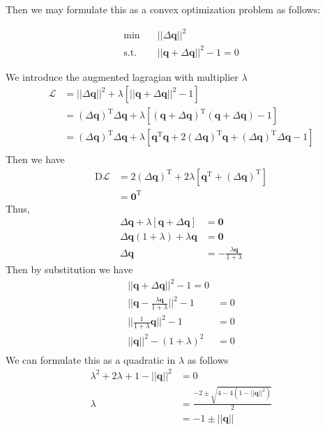 \documentclass{article}
\newcommand{\transpose}[1]{#1^\mathrm{T}}
\begin{document}
Then we may formulate this as a convex optimization problem as follows:

\begin{align}
    \min \quad & || \Delta \pmb{q} ||^2 \\
    \mathrm{s.t.} \quad & || \pmb{q} + \Delta \pmb{q} ||^2 -1 = 0
\end{align}

We introduce the augmented lagragian with multiplier $\lambda$
\begin{align*}
    \mathcal{L} &= || \Delta \pmb{q} ||^2 + \lambda \left[ || \pmb{q} + \Delta \pmb{q} ||^2 - 1 \right] \\
    &= \transpose{\left(\Delta \pmb{q} \right)} \Delta \pmb{q} + \lambda \left[ \transpose{\left(\pmb{q} + \Delta \pmb{q}\right)} \left(\pmb{q} + \Delta \pmb{q} \right) - 1 \right] \\
    &= \transpose{\left(\Delta \pmb{q} \right)} \Delta \pmb{q} + \lambda \left[ \transpose{\pmb{q}} \pmb{q} + 2\transpose{\left(\Delta \pmb{q} \right)} \pmb{q} + \transpose{\left(\Delta \pmb{q} \right)} \Delta \pmb{q}  - 1 \right] \\
\end{align*}
Then we have
\begin{align*}
    \mathrm{D}\mathcal{L} &= 2 \transpose{\left(\Delta \pmb{q} \right)} + 2 \lambda \left[ \transpose{\pmb{q}} + \transpose{\left(\Delta \pmb{q} \right)} \right] \\
    &= \transpose{\pmb{0}}
\end{align*}
Thus,
\begin{align*}
    \Delta \pmb{q} + \lambda \left[ \pmb{q} + \Delta \pmb{q} \right] &= \pmb{0} \\
    \Delta \pmb{q} (1 + \lambda) + \lambda \pmb{q} &= \pmb{0} \\
    \Delta \pmb{q} &= -\frac{\lambda \pmb{q}}{1 + \lambda}
\end{align*}
Then by substitution we have
\begin{align*}
    || \pmb{q} + \Delta \pmb{q} ||^2 -1 = 0 \\
    || \pmb{q} - \frac{\lambda \pmb{q}}{1 + \lambda} ||^2 - 1 &= 0 \\
    || \frac{1}{1 + \lambda} \pmb{q} ||^2 - 1 &= 0 \\
    || \pmb{q} ||^2 - (1+\lambda)^2 &= 0 \\
\end{align*}
We can formulate this as a quadratic in $\lambda$ as follows
\begin{align*}
    \lambda^2 + 2\lambda + 1 - || \pmb{q} ||^2 &= 0 \\
    \lambda &= \frac{-2 \pm \sqrt{4 - 4\left(1- ||\pmb{q}||^2\right)}}{2} \\
    &= -1 \pm || \pmb{q} ||
\end{align*}
\end{document}
